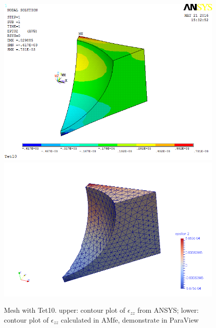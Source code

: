 \begin{figure}[htbp]
	\begin{center}
		\includegraphics[width=13cm,clip]{Tet10_Ezz.png} 		
		\includegraphics[width=13cm,clip]{Tet10_Ezz_P.png} 		
		\caption{Mesh with Tet10. upper: contour plot of $\epsilon_{zz}$ from ANSYS; lower: contour plot of $\epsilon_{zz}$ calculated in AMfe, demonstrate in ParaView} \label{fig: Tet10_Ezz}
	\end{center}
\end{figure}
\clearpage 

